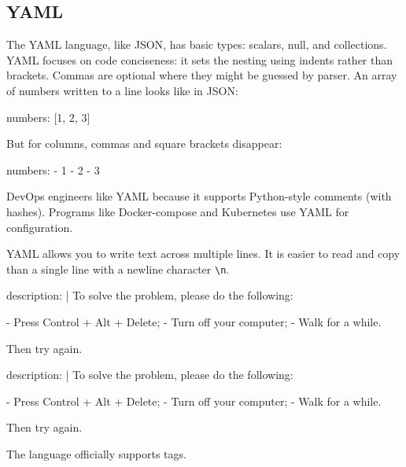 \fi

\subsection{YAML}


The YAML language, like JSON, has basic types: scalars, null, and collections. YAML focuses on code conciseness: it sets the nesting using indents rather than brackets. Commas are optional where they might be guessed by parser.  An array of numbers written to a line looks like in JSON:


\begin{yaml}
numbers: [1, 2, 3]
\end{yaml}

\noindent
But for columns, commas and square brackets disappear:

\begin{yaml}
numbers:
  - 1
  - 2
  - 3
\end{yaml}

DevOps engineers like YAML because it supports Python-style comments (with hashes). Programs like Docker-compose and Kubernetes use YAML for configuration.

YAML allows you to write text across multiple lines. It is easier to read and copy than a single line with a newline character \verb|\n|.

\ifnarrow

\begin{yaml}
description: |
  To solve the problem,
  please do the following:

  - Press Control + Alt + Delete;
  - Turn off your computer;
  - Walk for a while.

  Then try again.
\end{yaml}

\else

\begin{yaml}
description: |
  To solve the problem, please do the following:

  - Press Control + Alt + Delete;
  - Turn off your computer;
  - Walk for a while.

  Then try again.
\end{yaml}

\fi

The language officially supports tags.


